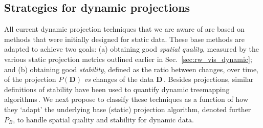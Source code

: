 
\subsection{Strategies for dynamic projections} 
\label{sec:taxonomy}
%
All current dynamic projection techniques that we are aware of are based on methods that were initially designed for static data. These base methods are adapted to achieve two goals: (a) obtaining good \emph{spatial quality}, measured by the various static projection metrics outlined earlier in Sec.~\ref{sec:rw_vis_dynamic}; and (b) obtaining good \emph{stability}, defined as the ratio between changes, over time, of the projection $P(\mathbf{D})$ \emph{vs} changes of the data $\mathbf{D}$\,\cite{Vernier2020}. Besides projections, similar definitions of stability have been used to quantify dynamic treemapping algorithms\,\cite{vernier_treemap,vernier_treemap2}.  We next propose to classify these techniques as a function of how they `adapt' the underlying base (static) projection algorithm, denoted further $P_B$, to handle spatial quality and stability for dynamic data.


